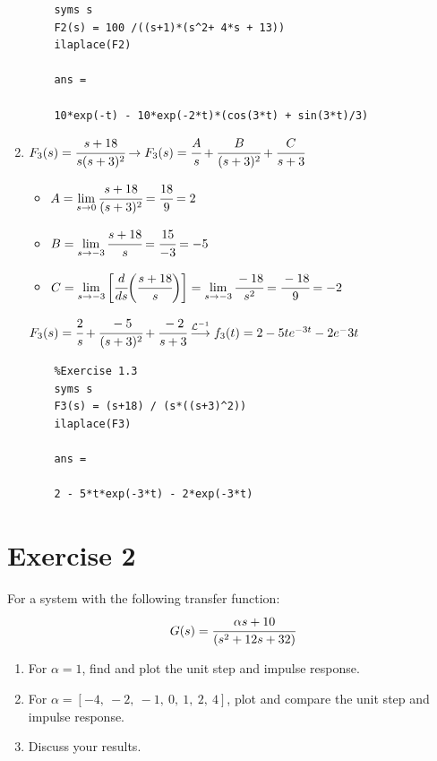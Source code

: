 \documentclass[a4paper,11pt]{article}
\begin{document}
\begin{enumerate}
\begin{lstlisting}
	syms s
	F2(s) = 100 /((s+1)*(s^2+ 4*s + 13))
	ilaplace(F2)
	
	ans =
	
	10*exp(-t) - 10*exp(-2*t)*(cos(3*t) + sin(3*t)/3)
	\end{lstlisting}
	\item $F_3(s)=\cfrac{s+18}{s(s+3)^2}\rightarrow
	F_3(s)=\cfrac{A}{s}+\cfrac{B}{(s+3)^2}+\cfrac{C}{s+3}$
	\begin{itemize}
		\item $A=\lim\limits_{s\to0}\cfrac{s+18}{(s+3)^2}=
		\cfrac{18}{9}=2$
		\item $B=\lim\limits_{s\to-3}\cfrac{s+18}{s}=
		\cfrac{15}{-3}=-5$
		\item $C =\lim\limits_{s\to-3}\bigg[\cfrac{d}{ds}
		\bigg(\cfrac{s+18}{s}\bigg)\bigg]=\lim\limits_{s\to-3}
		\cfrac{-18}{s^2}=\cfrac{-18}{9}=-2$
	\end{itemize}
	$F_3(s)=\cfrac{2}{s}+\cfrac{-5}{(s+3)^2}+\cfrac{-2}{s+3}
	\overset{\mathcal{L}^{-1}}{\longrightarrow}
	f_3(t) =2-5te^{-3t}-2e^-{3t}$
	\begin{lstlisting}
	%Exercise 1.3
	syms s
	F3(s) = (s+18) / (s*((s+3)^2))
	ilaplace(F3)
	
	ans =
	
	2 - 5*t*exp(-3*t) - 2*exp(-3*t)
	\end{lstlisting}
\end{enumerate}
\vskip0.5cm
\section*{Exercise 2} 
For a system with the following transfer function:
\begin{equation*}
G(s)=\cfrac{\alpha s+10}{(s^2+12s+32)}
\end{equation*}  

\begin{enumerate}
\item For $\alpha=1$, find and plot the unit step and impulse response.
\item For $\alpha=[-4, \ -2, \ -1, \ 0, \ 1, \ 2, \ 4]$, plot and compare the unit step and impulse response.
\item Discuss your results.
\end{enumerate}
\end{document}

